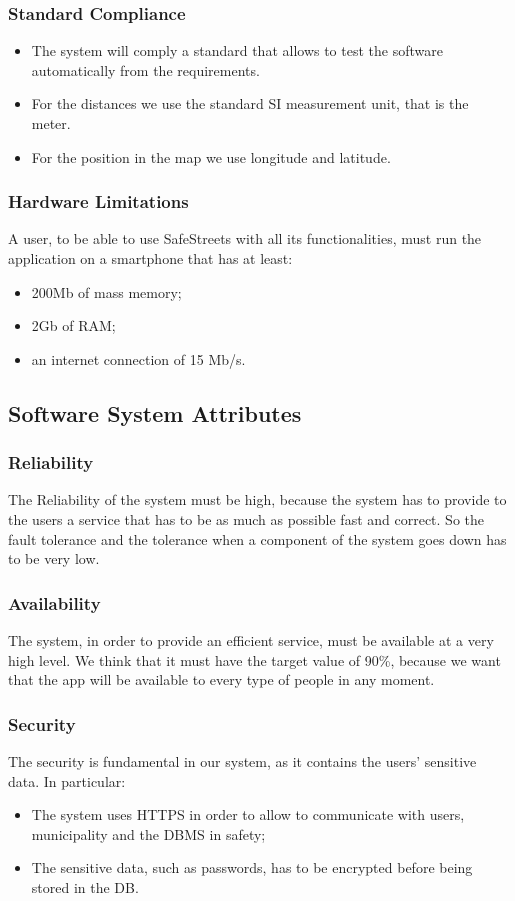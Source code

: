 \documentclass[titlepage]{article}
\begin{document}
\subsubsection{Standard Compliance}
\begin{itemize}
\item The system will comply a standard that allows to test the software automatically from the requirements.
\item For the distances we use the standard SI measurement unit, that is the meter.
\item For the position in the map we use longitude and latitude.
\end{itemize}

\subsubsection{Hardware Limitations}
A user, to be able to use SafeStreets with all its functionalities, must run the application on a smartphone that has at least:
\begin{itemize}
\item 200Mb of mass memory;
\item 2Gb of RAM;
\item an internet connection of 15 Mb/s.
\end{itemize}
 
 
\subsection{Software System Attributes}
\subsubsection{Reliability}
The Reliability of the system must be high, because the system has to provide to the users a service that has to be as much as possible fast and correct. So the fault tolerance and the tolerance when a component of the system goes down has to be very low. 


\subsubsection{Availability}
The system, in order to provide an efficient service, must be available at a very high level. We think that it must have the target value of 90\%, because we want that the app will be available to every type of people in any moment. 

\subsubsection{Security}
The security is fundamental in our system, as it contains the users' sensitive data. In particular:
\begin{itemize}
\item The system uses HTTPS in order to allow to communicate with users, municipality and the DBMS in safety;
\item The sensitive data, such as passwords, has to be encrypted before being stored in the DB.
\end{itemize}
\end{document}
